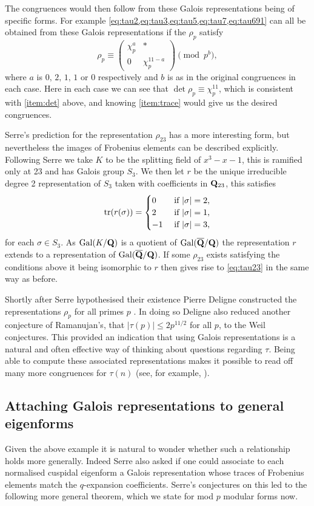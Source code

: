 \documentclass[a4paper,12pt]{article}
\begin{document}
\begin{ex}
The congruences would then follow from these Galois representations being of specific forms.
For example \cref{eq:tau2,eq:tau3,eq:tau5,eq:tau7,eq:tau691} can all be obtained from these Galois representations if the $\rho_p$ satisfy
\[
\rho_p \equiv \begin{pmatrix}
\chi_p^a & * \\
0        & \chi_p^{11-a}
\end{pmatrix}\pmod{p^b},
\]%
where $a$ is $0,\,2,\,1,\,1$ or $0$ respectively and $b$ is as in the original congruences in each case.
Here in each case we can see that $\det\rho_p \equiv \chi_p^{11}$, which is consistent with \cref{item:det} above, and knowing \cref{item:trace} would give us the desired congruences.

Serre's prediction for the representation $\rho_{23}$ has a more interesting form, but nevertheless the images of Frobenius elements can be described explicitly.
Following Serre we take $K$ to be the splitting field of $x^3 - x - 1$, this is ramified only at 23 and has Galois group $S_3$.
We then let $r$ be the unique irreducible degree 2 representation of $S_3$ taken with coefficients in $\mathbf{Q}_{23}$, this satisfies
\[
\operatorname{tr}(r(\sigma)) = \begin{cases}
0 &\text{ if } |\sigma| = 2,\\
2 &\text{ if } |\sigma| = 1,\\
-1 &\text{ if } |\sigma| = 3,
\end{cases}
\]
for each $\sigma \in S_3$.
As $\operatorname{Gal}(K/\mathbf{Q})$ is a quotient of $\operatorname{Gal}(\overline{\mathbf{Q}}/\mathbf{Q})$ the representation $r$ extends to a representation of $\operatorname{Gal}(\overline{\mathbf{Q}}/\mathbf{Q})$.
If some $\rho_{23}$ exists satisfying the conditions above it being isomorphic to $r$ then gives rise to \cref{eq:tau23} in the same way as before.

Shortly after Serre hypothesised their existence Pierre Deligne constructed the representations $\rho_p$ for all primes $p$  \cite{Deligne}.
In doing so Deligne also reduced another conjecture of Ramanujan's, that $|\tau(p)| \le 2p^{11/2}$ for all $p$, to the Weil conjectures.
This provided an indication that using Galois representations is a natural and often effective way of thinking about questions regarding $\tau$. %
Being able to compute these associated representations makes it possible to read off many more congruences for $\tau(n)$ (see, for example, \cite{Mascot}).
\end{ex}

\subsection{Attaching Galois representations to general eigenforms}
Given the above example it is natural to wonder whether such a relationship holds more generally.
Indeed Serre also asked if one could associate to each normalised cuspidal eigenform a Galois representation whose traces of Frobenius elements match the $q$-expansion coefficients.
Serre's conjectures on this led to the following more general theorem, which we state for mod $p$ modular forms now.
\end{document}
